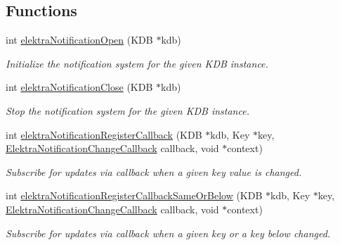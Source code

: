 \subsection*{Functions}
\begin{DoxyCompactItemize}
\item 
int \mbox{\hyperlink{group__kdbnotification_gaeae96154abdb5fdbf1b34a01e2b23e44}{elektra\+Notification\+Open}} (K\+DB $\ast$kdb)
\begin{DoxyCompactList}\small\item\em Initialize the notification system for the given K\+DB instance. \end{DoxyCompactList}\item 
int \mbox{\hyperlink{group__kdbnotification_ga5685dafbd4131011365628d6d9213594}{elektra\+Notification\+Close}} (K\+DB $\ast$kdb)
\begin{DoxyCompactList}\small\item\em Stop the notification system for the given K\+DB instance. \end{DoxyCompactList}\item 
int \mbox{\hyperlink{group__kdbnotification_gab42738703162b3769b1336dcade47b18}{elektra\+Notification\+Register\+Callback}} (K\+DB $\ast$kdb, Key $\ast$key, \mbox{\hyperlink{group__kdbnotification_gad0d800e32a72d89780321e5723301eb9}{Elektra\+Notification\+Change\+Callback}} callback, void $\ast$context)
\begin{DoxyCompactList}\small\item\em Subscribe for updates via callback when a given key value is changed. \end{DoxyCompactList}\item 
int \mbox{\hyperlink{group__kdbnotification_ga374edd4f4fff527d6511ce4d0df62681}{elektra\+Notification\+Register\+Callback\+Same\+Or\+Below}} (K\+DB $\ast$kdb, Key $\ast$key, \mbox{\hyperlink{group__kdbnotification_gad0d800e32a72d89780321e5723301eb9}{Elektra\+Notification\+Change\+Callback}} callback, void $\ast$context)
\begin{DoxyCompactList}\small\item\em Subscribe for updates via callback when a given key or a key below changed. \end{DoxyCompactList}\end{DoxyCompactItemize}
